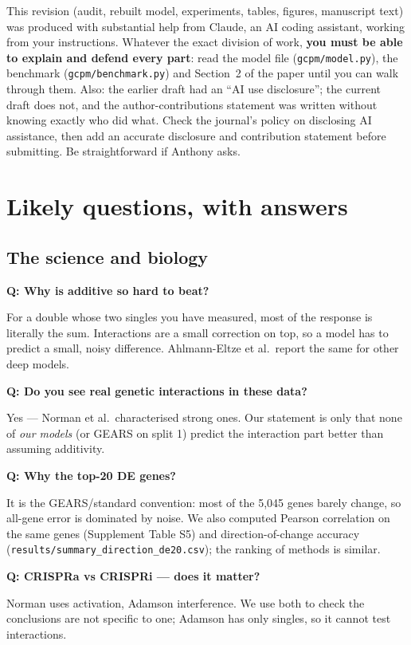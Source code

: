 \documentclass[10.5pt]{article}
\newcommand{\qa}[2]{\par\medskip\noindent\textbf{Q: #1}\par\noindent #2\par}
\begin{document}
\begin{warning}[title={\textbf{Be ready for: ``who wrote the code / the paper?''}}]
This revision (audit, rebuilt model, experiments, tables, figures, manuscript text) was produced with
substantial help from Claude, an AI coding assistant, working from your instructions. Whatever the exact
division of work, \textbf{you must be able to explain and defend every part}: read the model file
(\texttt{gcpm/model.py}), the benchmark (\texttt{gcpm/benchmark.py}) and Section~2 of the paper until you can
walk through them. Also: the earlier draft had an ``AI use disclosure''; the current draft does not, and the
author-contributions statement was written without knowing exactly who did what. Check the journal's policy
on disclosing AI assistance, then add an accurate disclosure and contribution statement before submitting. Be
straightforward if Anthony asks.
\end{warning}

\section{Likely questions, with answers}

\subsection*{The science and biology}
\qa{Why is additive so hard to beat?}{For a double whose two singles you have measured, most of the response
is literally the sum. Interactions are a small correction on top, so a model has to predict a small,
noisy difference. Ahlmann-Eltze et al.\ report the same for other deep models.}
\qa{Do you see real genetic interactions in these data?}{Yes --- Norman et al.\ characterised strong ones. Our
statement is only that none of \emph{our models} (or GEARS on split 1) predict the interaction part better
than assuming additivity.}
\qa{Why the top-20 DE genes?}{It is the GEARS/standard convention: most of the 5,045 genes barely change, so
all-gene error is dominated by noise. We also computed Pearson correlation on the same genes (Supplement Table S5) and
direction-of-change accuracy (\texttt{results/summary\_direction\_de20.csv}); the ranking of methods is similar.}
\qa{CRISPRa vs CRISPRi --- does it matter?}{Norman uses activation, Adamson interference. We use both to
check the conclusions are not specific to one; Adamson has only singles, so it cannot test interactions.}
\end{document}
